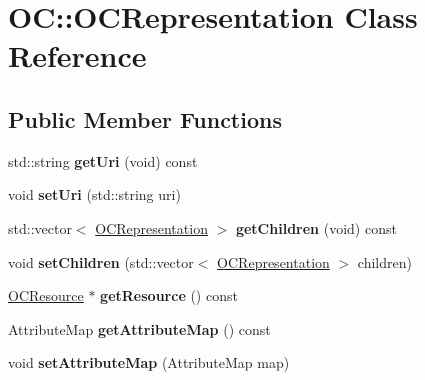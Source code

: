 \hypertarget{classOC_1_1OCRepresentation}{}\section{O\+C\+:\+:O\+C\+Representation Class Reference}
\label{classOC_1_1OCRepresentation}
\subsection*{Public Member Functions}
\begin{DoxyCompactItemize}
\item 
\hypertarget{classOC_1_1OCRepresentation_a47015cc44e845a03e622303377dd045d}{}std\+::string {\bfseries get\+Uri} (void) const \label{classOC_1_1OCRepresentation_a47015cc44e845a03e622303377dd045d}

\item 
\hypertarget{classOC_1_1OCRepresentation_ab5b41b93da5324c40bda55f275194e56}{}void {\bfseries set\+Uri} (std\+::string uri)\label{classOC_1_1OCRepresentation_ab5b41b93da5324c40bda55f275194e56}

\item 
\hypertarget{classOC_1_1OCRepresentation_a2c6d8a1b75eeffb7dd1df9c311aca7d0}{}std\+::vector$<$ \hyperlink{classOC_1_1OCRepresentation}{O\+C\+Representation} $>$ {\bfseries get\+Children} (void) const \label{classOC_1_1OCRepresentation_a2c6d8a1b75eeffb7dd1df9c311aca7d0}

\item 
\hypertarget{classOC_1_1OCRepresentation_a16bab188bcd909046d3d88947a0af156}{}void {\bfseries set\+Children} (std\+::vector$<$ \hyperlink{classOC_1_1OCRepresentation}{O\+C\+Representation} $>$ children)\label{classOC_1_1OCRepresentation_a16bab188bcd909046d3d88947a0af156}

\item 
\hypertarget{classOC_1_1OCRepresentation_a704304f938be58725ef0c4f27492d1a4}{}\hyperlink{classOC_1_1OCResource}{O\+C\+Resource} $\ast$ {\bfseries get\+Resource} () const \label{classOC_1_1OCRepresentation_a704304f938be58725ef0c4f27492d1a4}

\item 
\hypertarget{classOC_1_1OCRepresentation_aec498ff6c91ad13e1dce78bc13e7c470}{}Attribute\+Map {\bfseries get\+Attribute\+Map} () const \label{classOC_1_1OCRepresentation_aec498ff6c91ad13e1dce78bc13e7c470}

\item 
\hypertarget{classOC_1_1OCRepresentation_ad606316188b8fbd7820a038474556f0c}{}void {\bfseries set\+Attribute\+Map} (Attribute\+Map map)\label{classOC_1_1OCRepresentation_ad606316188b8fbd7820a038474556f0c}


\end{DoxyCompactItemize}
